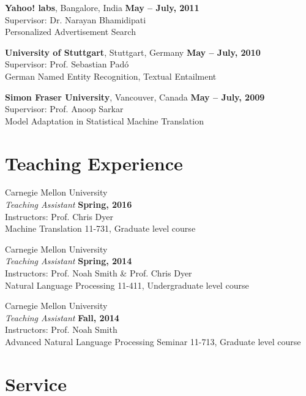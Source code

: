 \documentclass[margin,line]{res}
\begin{document}
\begin{resume}
{\bf Yahoo! labs}, Bangalore, India \hfill {\bf May -- July, 2011}\\
Supervisor: Dr. Narayan Bhamidipati\\
Personalized Advertisement Search

{\bf University of Stuttgart}, Stuttgart, Germany \hfill {\bf May -- July, 2010}\\
Supervisor: Prof. Sebastian Pad\'{o} \\
German Named Entity Recognition, Textual Entailment

{\bf Simon Fraser University}, Vancouver, Canada \hfill {\bf May -- July, 2009}\\
Supervisor: Prof. Anoop Sarkar\\
Model Adaptation in Statistical Machine Translation

\section{\sc Teaching Experience}

{Carnegie Mellon University} \\
{\em Teaching Assistant} \hfill {\bf Spring, 2016}\\
Instructors: Prof. Chris Dyer\\
Machine Translation 11-731, Graduate level course

{Carnegie Mellon University} \\
{\em Teaching Assistant} \hfill {\bf Spring, 2014}\\
Instructors: Prof. Noah Smith \& Prof. Chris Dyer\\
Natural Language Processing 11-411, Undergraduate level course

{Carnegie Mellon University}\\
{\em Teaching Assistant} \hfill {\bf Fall, 2014}\\
Instructors: Prof. Noah Smith\\
Advanced Natural Language Processing Seminar 11-713, Graduate level course


\section{\sc Service}
\begin{hangparas}{.25in}{1}


\end{hangparas}
\end{resume}
\end{document}
